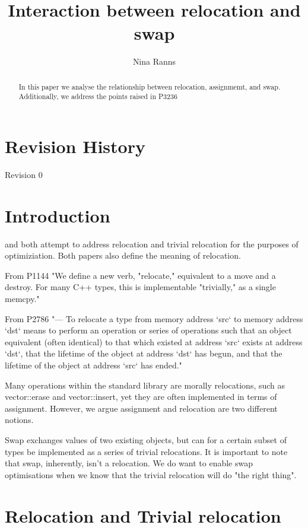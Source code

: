 \documentclass{wg21}
\title{Interaction between relocation and swap}
\author{Nina Ranns}{dinka.ranns@gmail.com}
\begin{document}
\maketitle

\begin{abstract}
\noindent
In this paper we analyse the relationship between relocation, assignmemt, and swap.
Additionally, we address the points raised in P3236 %
\end{abstract}

\tableofcontents

\clearpage
\section*{Revision History}

Revision 0

\section{Introduction}

 and  both attempt to address relocation and trivial relocation for the purposes of optimiziation. Both papers also define the meaning of relocation.

From P1144
"We define a new verb, "relocate," equivalent to a move and a destroy. For many C++ types, this is implementable "trivially," as a single memcpy."

From P2786
"— To relocate a type from memory address `src` to memory address `dst` means to perform an operation or series of operations such that an object equivalent (often identical) to that which existed at address `src`
exists at address `dst`, that the lifetime of the object at address `dst` has begun, and that the lifetime of the
object at address `src` has ended."

Many operations within the standard library are morally relocations, such as vector::erase and vector::insert, yet they are often implemented in terms of assignment. However, we argue assignment and relocation are two different notions.

Swap exchanges values of two existing objects, but can for a certain subset of types be implemented as a series of trivial relocations. It is important to note that swap, inherently, isn't a relocation. We do want to enable swap optimisations when we know that the trivial relocation will do "the right thing".

\section{Relocation and Trivial relocation}
\end{document}
